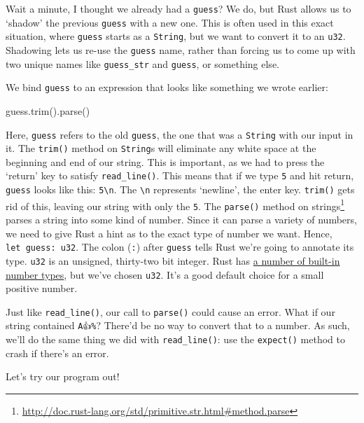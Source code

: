 \documentclass[a4paper,]{book}
\newenvironment{Shaded}{\begin{snugshade}}{\end{snugshade}}
\newcommand{\KeywordTok}[1]{\textcolor[rgb]{0.13,0.29,0.53}{\textbf{{#1}}}}
\newcommand{\NormalTok}[1]{{#1}}
\renewcommand{\href}[2]{#2\footnote{\url{#1}}}
\begin{document}
Wait a minute, I thought we already had a \texttt{guess}? We do, but
Rust allows us to `shadow' the previous \texttt{guess} with a new one.
This is often used in this exact situation, where \texttt{guess} starts
as a \texttt{String}, but we want to convert it to an \texttt{u32}.
Shadowing lets us re-use the \texttt{guess} name, rather than forcing us
to come up with two unique names like \texttt{guess\_str} and
\texttt{guess}, or something else.

We bind \texttt{guess} to an expression that looks like something we
wrote earlier:

\begin{Shaded}
\begin{Highlighting}[]
\NormalTok{guess.trim().parse()}
\end{Highlighting}
\end{Shaded}

Here, \texttt{guess} refers to the old \texttt{guess}, the one that was
a \texttt{String} with our input in it. The \texttt{trim()} method on
\texttt{String}s will eliminate any white space at the beginning and end
of our string. This is important, as we had to press the `return' key to
satisfy \texttt{read\_line()}. This means that if we type \texttt{5} and
hit return, \texttt{guess} looks like this: \texttt{5\textbackslash{}n}.
The \texttt{\textbackslash{}n} represents `newline', the enter key.
\texttt{trim()} gets rid of this, leaving our string with only the
\texttt{5}. The
\href{http://doc.rust-lang.org/std/primitive.str.html\#method.parse}{\texttt{parse()}
method on strings} parses a string into some kind of number. Since it
can parse a variety of numbers, we need to give Rust a hint as to the
exact type of number we want. Hence, \texttt{let\ guess:\ u32}. The
colon (\texttt{:}) after \texttt{guess} tells Rust we're going to
annotate its type. \texttt{u32} is an unsigned, thirty-two bit integer.
Rust has \protect\hyperlink{numeric-types}{a number of built-in number
types}, but we've chosen \texttt{u32}. It's a good default choice for a
small positive number.

Just like \texttt{read\_line()}, our call to \texttt{parse()} could
cause an error. What if our string contained \texttt{A👍\%}? There'd be
no way to convert that to a number. As such, we'll do the same thing we
did with \texttt{read\_line()}: use the \texttt{expect()} method to
crash if there's an error.

Let's try our program out!

\begin{Shaded}
\end{Shaded}
\end{document}
